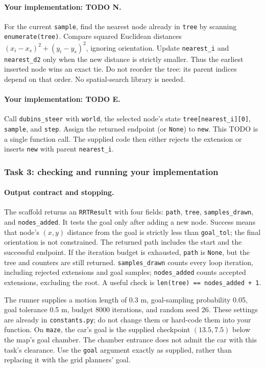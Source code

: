 \documentclass[11pt]{article}
\begin{document}
\paragraph{Your implementation: TODO N.}
For the current \texttt{sample}, find the nearest node already in
\texttt{tree} by scanning \texttt{enumerate(tree)}. Compare squared
Euclidean distances $(x_i-x_s)^2+(y_i-y_s)^2$, ignoring orientation.
Update \texttt{nearest\_i} and \texttt{nearest\_d2} only when the new
distance is strictly smaller. Thus the earliest inserted node wins
an exact tie. Do not reorder the tree: its parent indices depend on
that order. No spatial-search library is needed.

\paragraph{Your implementation: TODO E.}
Call \texttt{dubins\_steer} with \texttt{world}, the selected node's
state \texttt{tree[nearest\_i][0]}, \texttt{sample}, and \texttt{step}.
Assign the returned endpoint (or \texttt{None}) to \texttt{new}. This
TODO is a single function call. The supplied code then either rejects
the extension or inserts \texttt{new} with parent \texttt{nearest\_i}.

\clearpage
\subsubsection*{Task 3: checking and running your implementation}
\paragraph{Output contract and stopping.}
The scaffold returns an \texttt{RRTResult} with four fields:
\texttt{path}, \texttt{tree}, \texttt{samples\_drawn}, and \texttt{nodes\_added}.
It tests the goal only after adding a new node. Success means that node's
$(x,y)$ distance from the goal is strictly less than \texttt{goal\_tol};
the final orientation is not constrained. The returned path includes
the start and the successful endpoint. If the iteration budget is
exhausted, \texttt{path} is \texttt{None}, but the tree and counters
are still returned. \texttt{samples\_drawn} counts every loop iteration,
including rejected extensions and goal samples; \texttt{nodes\_added}
counts accepted extensions, excluding the root. A useful check is
\texttt{len(tree) == nodes\_added + 1}.

The runner supplies a motion length of 0.3 m, goal-sampling probability
0.05, goal tolerance 0.5 m, budget 8000 iterations, and random seed 26.
These settings are already in \texttt{constants.py}; do not change them
or hard-code them into your function. On \texttt{maze}, the car's goal
is the supplied checkpoint $(13.5,7.5)$ below the map's goal chamber.
The chamber entrance does not admit the car with this task's clearance.
Use the \texttt{goal} argument exactly as supplied, rather than replacing
it with the grid planners' goal.
\end{document}
